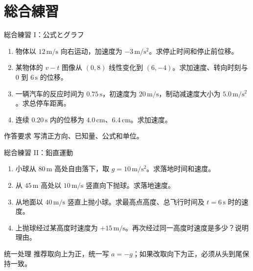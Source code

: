 \documentclass[notheorems,aspectratio=169]{beamer}
\newcommand{\unit}[1]{\,\mathrm{#1}}
\begin{document}
\section{総合練習}

\begin{frame}{総合練習 I：公式とグラフ}
  \small
  \begin{enumerate}
    \item 物体以 $12\unit{m/s}$ 向右运动，加速度为 $-3\unit{m/s^2}$。求停止时间和停止前位移。
    \item 某物体的 $v-t$ 图像从 $(0,8)$ 线性变化到 $(6,-4)$。求加速度、转向时刻与 $0$ 到 $6\unit{s}$ 的位移。
    \item 一辆汽车的反应时间为 $0.75\unit{s}$，初速度为 $20\unit{m/s}$，制动减速度大小为 $5.0\unit{m/s^2}$。求总停车距离。
    \item 连续 $0.20\unit{s}$ 内的位移为 $4.0\unit{cm}$、$6.4\unit{cm}$。求加速度。
  \end{enumerate}
  \begin{alertblock}{作答要求}
    写清正方向、已知量、公式和单位。
  \end{alertblock}
\end{frame}

\begin{frame}{総合練習 II：鉛直運動}
  \small
  \begin{enumerate}
    \item 小球从 $80\unit{m}$ 高处自由落下，取 $g=10\unit{m/s^2}$。求落地时间和速度。
    \item 从 $45\unit{m}$ 高处以 $10\unit{m/s}$ 竖直向下抛球。求落地速度。
    \item 从地面以 $40\unit{m/s}$ 竖直上抛小球。求最高点高度、总飞行时间及 $t=6\unit{s}$ 时的速度。
    \item 上抛球经过某高度时速度为 $+15\unit{m/s}$。再次经过同一高度时速度是多少？说明理由。
  \end{enumerate}
  \begin{alertblock}{统一处理}
    推荐取向上为正，统一写 $a=-g$；如果改取向下为正，必须从头到尾保持一致。
  \end{alertblock}
\end{frame}
\end{document}
